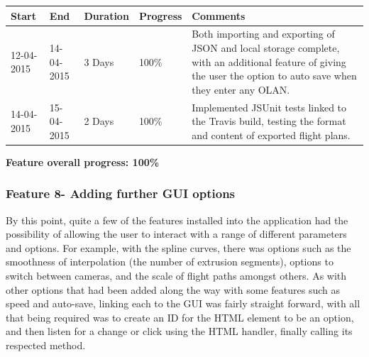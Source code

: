 \begin{table}[h]
\begin{tabular}{|l|l|l|l|p{7cm}|}
\hline
\textbf{Start} & \textbf{End} & \textbf{Duration} & \textbf{Progress} & \textbf{Comments}                                                                                                     \\ \hline
12-04-2015     & 14-04-2015   & 3 Days            & 100\%             &  Both importing and exporting of JSON and local storage complete, with an additional feature of giving the user the option to auto save when they enter any OLAN.\\ \hline
14-04-2015     & 15-04-2015   & 2 Days            & 100\%             &  Implemented JSUnit tests linked to the Travis build, testing the format and content of exported flight plans.\\ \hline
\end{tabular}
\end{table}

\textbf{Feature overall progress: 100\%}

\subsubsection{Feature 8- Adding further GUI options}
By this point, quite a few of the features installed into the application had the possibility of allowing the user to interact with a range of different parameters and options. For example, with the spline curves, there was options such as the smoothness of interpolation (the number of extrusion segments), options to switch between cameras, and the scale of flight paths amongst others. As with other options that had been added along the way with some features such as speed and auto-save, linking each to the GUI was fairly straight forward, with all that being required was to create an ID for the HTML element to be an option, and then listen for a change or click using the HTML handler, finally calling its respected method.  

